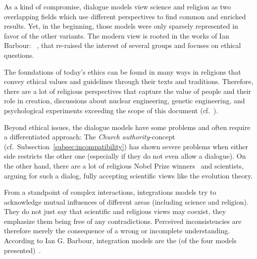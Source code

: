 \label{fig:dialogue}

As a kind of compromise, dialogue models view science and religion as two overlapping fields which use different perspectives to find common and enriched results.
Yet, in the beginning, those models were only sparsely represented in favor of the other variants.
The modern view is rooted in the works of Ian Barbour: ~\cite{barbour1976myths}, that re-raised the interest of several groups and focuses on ethical questions.

The foundations of today's ethics can be found in many ways in religions that convey ethical values and guidelines through their texts and traditions.
Therefore, there are a lot of religious perspectives that capture the value of people and their role in creation, discussions about nuclear engineering, genetic engineering, and psychological experiments exceeding the scope of this document (cf.~\cite{barbour1993ethics,reiss2001improving}).

Beyond ethical issues, the dialogue models have some problems and often require a differentiated approach:
The \emph{Church authority}-concept (cf.~Subsection~\ref{subsec:incompatibility}) has shown severe problems when either side restricts the other one (especially if they do not even allow a dialogue).
On the other hand, there are a lot of religious Nobel Prize winners~\cite{shalev2002100} and scientists, arguing for such a dialog, fully accepting scientific views like the evolution theory.


\label{subsec:integration}

From a standpoint of complex interactions, integrations models try to acknowledge mutual influences of different areas (including science and religion).
They do not just say that scientific and religious views may coexist, they emphasize them being free of any contradictions.
Perceived inconsistencies are therefore merely the consequence of a wrong or incomplete understanding.
According to Ian G. Barbour, integration models are the  (of the four models presented)~\cite[p.~2]{Barbour2002}.


